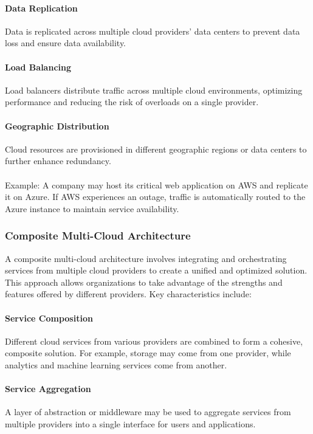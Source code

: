 \paragraph{Data Replication}

Data is replicated across multiple cloud providers' data centers to prevent data loss and ensure data availability.

\paragraph{Load Balancing}
Load balancers distribute traffic across multiple cloud environments, optimizing performance and reducing the risk of overloads on a single provider.


\paragraph{Geographic Distribution}
Cloud resources are provisioned in different geographic regions or data centers to further enhance redundancy.
\\
\\
Example: A company may host its critical web application on AWS and replicate it on Azure. 
If AWS experiences an outage, traffic is automatically routed to the Azure instance to maintain service availability.

\subsubsection{Composite Multi-Cloud Architecture}

A composite multi-cloud architecture involves integrating and orchestrating services from multiple cloud providers to create a unified and optimized solution. 
This approach allows organizations to take advantage of the strengths and features offered by different providers. 
Key characteristics include:

\paragraph{Service Composition}
Different cloud services from various providers are combined to form a cohesive, composite solution. 
For example, storage may come from one provider, while analytics and machine learning services come from another.

\paragraph{Service Aggregation}
A layer of abstraction or middleware may be used to aggregate services 
from multiple providers into a single interface for users and applications.

